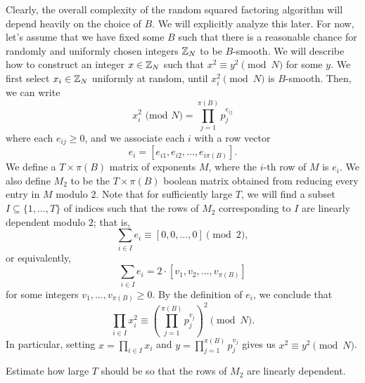Clearly, the overall complexity of the random squared factoring algorithm 
will depend heavily on the choice of $B$. We will explicitly analyze this later. 
For now, let's assume that we have fixed some $B$ such that there is a reasonable 
chance for randomly and uniformly chosen integers $\mathbb{Z}_N$ to be $B$-smooth. 
We will describe how to construct an integer $x \in \mathbb{Z}_N$ such that 
$x^2 \equiv y^2 \pmod N$ for some $y$. We first select $x_i \in \mathbb{Z}_N$ 
uniformly at random, until $x_i^2 \pmod N$ is $B$-smooth. Then, we can write 
\[ x_i^2 \text{ (mod $N$)} = \prod_{j=1}^{\pi(B)} p_j^{e_{ij}} \] 
where each $e_{ij} \geq 0$, and we associate each $i$ with a row vector 
\[ e_i = [e_{i1}, e_{i2}, \dots, e_{i\pi(B)}]. \] 
We define a $T \times \pi(B)$ matrix of exponents $M$, where the $i$-th 
row of $M$ is $e_i$. We also define $M_2$ to be the $T \times \pi(B)$ 
boolean matrix obtained from reducing every entry in $M$ modulo $2$. 
Note that for sufficiently large $T$, we will find a subset $I \subseteq 
\{1, \dots, T\}$ of indices such that the rows of $M_2$ corresponding to 
$I$ are linearly dependent modulo $2$; that is, 
\[ \sum_{i \in I} e_i \equiv [0, 0, \dots, 0] \pmod 2, \] 
or equivalently, 
\[ \sum_{i \in I} e_i = 2 \cdot [v_1, v_2, \dots, v_{\pi(B)}] \] 
for some integers $v_1, \dots, v_{\pi(B)} \geq 0$. By the definition of 
$e_i$, we conclude that 
\[ \prod_{i \in I} x_i^2 \equiv 
\left( \prod_{j=1}^{\pi(B)} p_j^{v_j} \right)^{\!2} \pmod N. \] 
In particular, setting $x = \prod_{i \in I} x_i$ and 
$y = \prod_{j=1}^{\pi(B)} p_j^{v_j}$ gives us $x^2 \equiv y^2 \pmod N$. 

\begin{exercise}
    Estimate how large $T$ should be so that the rows of $M_2$ are linearly 
    dependent. 
\end{exercise}

